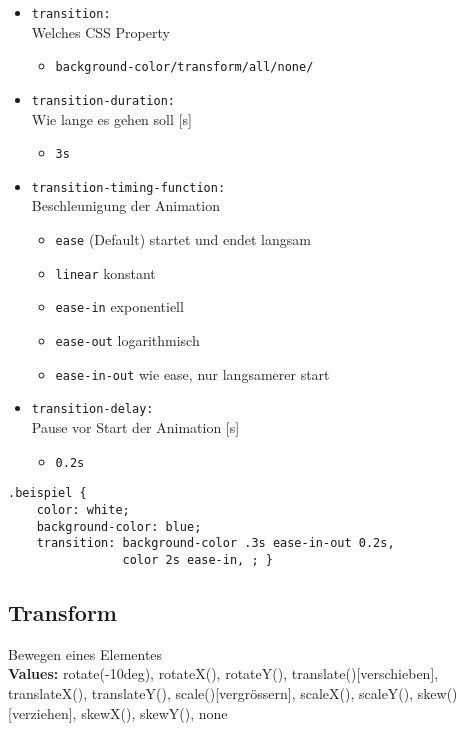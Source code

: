 \begin{itemize}
    \item \texttt{transition:}\\
    Welches CSS Property
    \begin{itemize}
        \item \texttt{background-color/transform/all/none/}
    \end{itemize}
    \item \texttt{transition-duration:}\\
    Wie lange es gehen soll [s]
    \begin{itemize}
        \item \texttt{3s}
    \end{itemize}
    \item \texttt{transition-timing-function:}\\
    Beschleunigung der Animation
    \begin{itemize}
        \item \texttt{ease} (Default) startet und endet langsam
        \item \texttt{linear} konstant
        \item \texttt{ease-in} exponentiell
        \item \texttt{ease-out} logarithmisch
        \item \texttt{ease-in-out} wie ease, nur langsamerer start
    \end{itemize}
    \item \texttt{transition-delay:}\\
    Pause vor Start der Animation [s]
    \begin{itemize}
        \item \texttt{0.2s}
    \end{itemize}
\end{itemize}
\begin{lstlisting}
.beispiel {
    color: white;
    background-color: blue;
    transition: background-color .3s ease-in-out 0.2s,
                color 2s ease-in, ; }
\end{lstlisting}

\subsection{Transform}
Bewegen eines Elementes\\
\textbf{Values:} rotate(-10deg), rotateX(), rotateY(),  translate()[verschieben], translateX(), translateY(), scale()[vergrössern], scaleX(), scaleY(), skew()[verziehen], skewX(), skewY(), none
